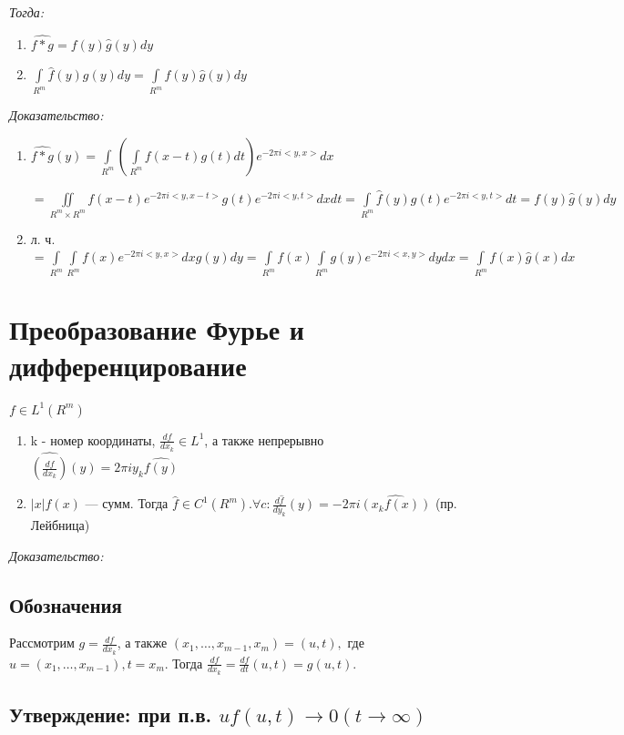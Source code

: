 \documentclass[paper=a4, fontsize=17pt]{article}
\begin{document}
	\emph{Тогда:}
	\begin{enumerate}
		\item $ \widehat{f \ast g} = f(y)\widehat{g}(y) dy$
		\item $ \int\limits_{R^m} \widehat{f}(y)g(y) dy = \int\limits_{R^m} f(y)\widehat{g}(y) dy $
	\end{enumerate}
	\emph{Доказательство:}
	\begin{enumerate}
		\item $ \widehat{f \ast g}(y)
		= \int\limits_{R^m} (\int\limits_{R^m} f(x - t)g(t) dt) e^{-2\pi i <y, x>} dx $

		$= \iint\limits_{R^m \times R^m} f(x - t)e^{-2\pi i <y, x-t>} g(t)e^{-2\pi i <y, t>} dx dt = \int\limits_{R^m} \hat{f}(y) g(t) e^{-2\pi i <y, t>} dt = f(y)\widehat{g}(y) dy$

		\item л. ч.
		$ = \int\limits_{R^m} \int\limits_{R^m} f(x) e^{-2\pi i <y, x>} dx g(y) dy
		= \int\limits_{R^m} f(x) \int\limits_{R^m} g(y) e^{-2\pi i <x, y>} dy  dx = \int\limits_{R^m}f(x)\widehat{g}(x) dx$
	\end{enumerate}

\section{Преобразование Фурье и дифференцирование}

$f \in L^1(R^m)$
\begin{enumerate}
	\item k - номер координаты, $\frac{df}{dx_k} \in L^1$, а также непрерывно $ \hat{(\frac{df}{dx_k})}(y) = 2\pi i y_k \hat{f(y)}$
	\item $|x|f(x)$ --- сумм. Тогда $\hat{f} \in C^1(R^m). \forall c : \frac{d\hat{f}}{dy_k}(y) = -2\pi i \hat{(x_k f(x))}$ (пр. Лейбница)
\end{enumerate}

\emph{Доказательство:}

\subsection{Обозначения}

Рассмотрим $g = \frac{df}{dx_k}$, а также $(x_1, \ldots, x_{m-1}, x_m) = (u, t), $ где $u = (x_1, \ldots, x_{m-1}), t = x_m$. Тогда $\frac{df}{dx_k} = \frac{df}{dt}(u, t) = g(u, t)$.

\subsection{Утверждение: при п.в. $u f(u, t) \rightarrow 0 (t \rightarrow \infty)$}
\end{document}
